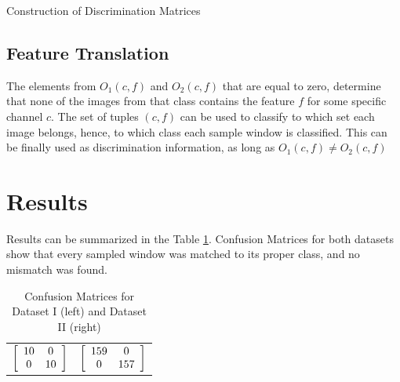 \documentclass[nouppercase]{ifmbe}
\begin{document}
\begin{algorithm}
	  
 \caption{Construction of Discrimination Matrices}
 \label{algorithm1}
\end{algorithm}
   
\subsection{Feature Translation}   

The elements from  $O_1(c,f)$ and $O_2(c,f)$ that are equal to zero, determine that none of the images from that class contains the feature $f$ for some specific channel $c$.  The set of tuples $ (c,f) $ can be used to classify to which set each image belongs, hence, to which class each sample window is classified.   This can be finally used as discrimination information, as long as $O_1(c,f) \neq O_2(c,f)$

\section{Results}

Results can be summarized in the Table \ref{table3}. Confusion Matrices for both datasets show that every sampled window was matched to its proper class, and no mismatch was found. 

\begin{table}[h]
        \footnotesize  \onehalfspacing
        \caption{Confusion Matrices for Dataset I (left) and Dataset II (right)}
		\begin{center}		
		\begin{tabular}{ c c }
		$\left[
		\begin{array}{c c}
		10 & 0 \\
		0 & 10 \end{array}
		\right] 
		$ & 
		$ \left[
		\begin{array}{c c}
		159 & 0 \\
		0 & 157 \end{array}
		\right]
		$ 
		\end{tabular}
		\end{center}
        \label{table3}
\end{table}
\end{document}

